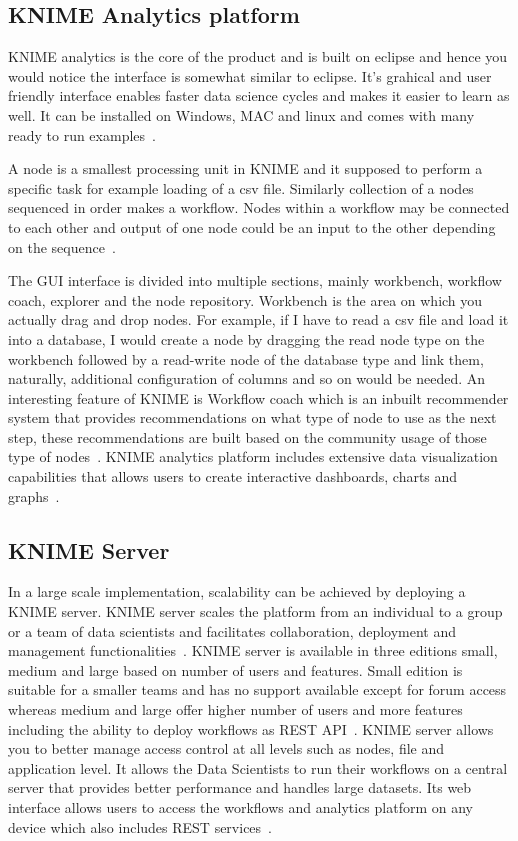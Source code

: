 \subsection{KNIME Analytics platform}
KNIME analytics is the core of the product and is built on eclipse and
hence you would notice the interface is somewhat similar to
eclipse. It's grahical and user friendly interface enables faster data
science cycles and makes it easier to learn as well. It can be
installed on Windows, MAC and linux and comes with many ready to run
examples~\cite{hid-sp18-517-kap}.

A node is a smallest processing unit in KNIME and it supposed to
perform a specific task for example loading of a csv file. Similarly
collection of a nodes sequenced in order makes a workflow. Nodes
within a workflow may be connected to each other and output of one
node could be an input to the other depending on the
sequence~\cite{hid-sp18-517-kintro}.

The GUI interface is divided into multiple sections, mainly workbench,
workflow coach, explorer and the node repository. Workbench is the
area on which you actually drag and drop nodes. For example, if I have
to read a csv file and load it into a database, I would create a node
by dragging the read node type on the workbench followed by a
read-write node of the database type and link them, naturally,
additional configuration of columns and so on would be needed.  An
interesting feature of KNIME is Workflow coach which is an inbuilt
recommender system that provides recommendations on what type of node
to use as the next step, these recommendations are built based on the
community usage of those type of nodes~\cite{hid-sp18-517-ch1sec1}.
KNIME analytics platform includes extensive data visualization 
capabilities that allows users to create interactive dashboards,
charts and graphs~\cite{hid-sp18-517-ch5}.

\subsection{KNIME Server}
In a large scale implementation, scalability can be achieved by
deploying a KNIME server. KNIME server scales the platform from an
individual to a group or a team of data scientists and facilitates
collaboration, deployment and management
functionalities~\cite{hid-sp18-517-server}. KNIME server is
available in three editions small, medium and large based on number of
users and features. Small edition is suitable for a smaller teams and
has no support available except for forum access whereas medium and
large offer higher number of users and more features including the
ability to deploy workflows as REST API~\cite{hid-sp18-517-editions}.
KNIME server allows you to better manage access control at all levels 
such as nodes, file and application level. It allows the Data Scientists 
to run their workflows on a central server that provides better 
performance and handles large datasets. Its web interface allows users 
to access the workflows and analytics platform on any device which 
also includes REST services~\cite{hid-sp18-517-editions}.

